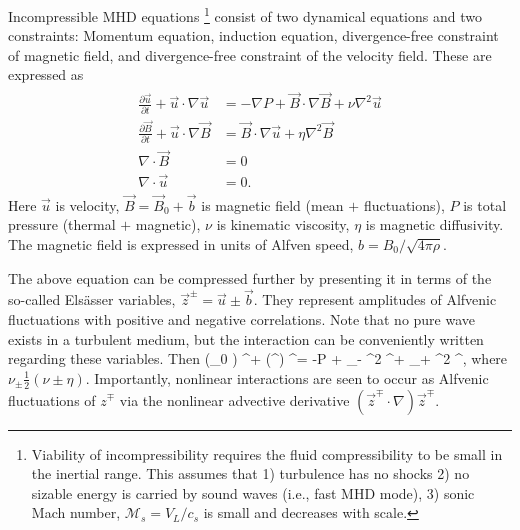 \documentclass[usenatbib,twocolumn, twocolappendix]{aastex63}
\begin{document}
Incompressible MHD equations%
\footnote{
    Viability of incompressibility requires the fluid compressibility to be small in the inertial range.
    This assumes that 
    1) turbulence has no shocks
    2) no sizable energy is carried by sound waves (i.e., fast MHD mode),
    3) sonic Mach number, $\mathcal{M}_s = V_L/c_s$ is small and decreases with scale.
}
consist of two dynamical equations and two constraints:
Momentum equation,
induction equation,
divergence-free constraint of magnetic field,
and divergence-free constraint of the velocity field.
These are expressed as
\begin{align}\begin{split}
    \frac{\partial \vec{u}}{\partial t} + \vec{u} \cdot \nabla \vec{u} &= -\nabla P + \vec{B} \cdot \nabla \vec{B} + \nu \nabla^2 \vec{u} \\
    \frac{\partial \vec{B}}{\partial t} + \vec{u} \cdot \nabla \vec{B} &= \vec{B} \cdot \nabla \vec{u} + \eta \nabla^2 \vec{B} \\
    \nabla \cdot \vec{B} &= 0\\
    \nabla \cdot \vec{u} &= 0.
\end{split}\end{align}
Here $\vec{u}$ is velocity, $\vec{B} = \vec{B}_0 + \vec{b}$ is magnetic field (mean $+$ fluctuations), $P$ is total pressure (thermal $+$ magnetic), $\nu$ is kinematic viscosity, $\eta$ is magnetic diffusivity.
The magnetic field is expressed in units of Alfven speed, $b = B_0/\sqrt{4\pi \rho}$.

The above equation can be compressed further by presenting it in terms of the so-called Els\"asser variables, $\vec{z}^\pm = \vec{u} \pm \vec{b}$.
They represent amplitudes of Alfvenic fluctuations with positive and negative correlations.
Note that no pure wave exists in a turbulent medium, but the interaction can be conveniently written regarding these variables.
Then
\be
     \mp (_0 \cdot \nabla) ^\pm + (^\mp \cdot \nabla) ^\pm = -\nabla P  + \nu_- \nabla^2 ^\pm  + \nu_+ \nabla^2 ^\mp,
\ee
where $\nu_\pm \frac{1}{2} (\nu \pm \eta)$.
Importantly, nonlinear interactions are seen to occur as Alfvenic fluctuations of $z^\mp$ via the nonlinear advective derivative $(\vec{z}^\mp \cdot \nabla) \vec{z}^\mp$.
\end{document}
